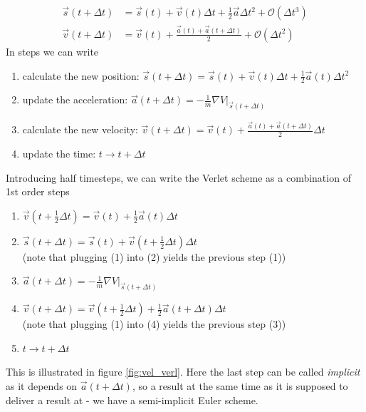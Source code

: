 \begin{equation}
  \begin{aligned}
    \vec{s}(t+\Delta t) &= \vec{s}(t) + \vec{v}(t) \Delta t + \frac{1}{2} \vec{a} \Delta t^2 +  \mathcal{O}(\Delta t^3) \\
    \vec{v}(t+\Delta t) &= \vec{v}(t) + \frac{\vec{a}(t) + \vec{a}(t + \Delta t)}{2} + \mathcal{O}(\Delta t^2)
  \end{aligned}
\end{equation}
In steps we can write
\begin{enumerate}
  \item calculate the new position: $\vec{s}(t+\Delta t) = \vec{s}(t) + \vec{v}(t)\Delta t + \frac{1}{2} \vec{a}(t) \Delta t^2$
  \item update the acceleration: $\vec{a}(t+\Delta t) = -\frac{1}{m} \left. \nabla V \right|_{\vec{s}(t+\Delta t)}$
  \item calculate the new velocity: $\vec{v}(t+\Delta t) = \vec{v}(t) + \frac{\vec{a}(t) + \vec{a}(t+\Delta t)}{2} \Delta t$
  \item update the time: $t \rightarrow t + \Delta t$
\end{enumerate}
Introducing half timesteps, we can write the Verlet scheme as a combination of 1st order steps
\begin{enumerate}
  \item $\vec{v}\left( t + \frac{1}{2} \Delta t \right) = \vec{v}(t) + \frac{1}{2} \vec{a}(t) \Delta t$
  \item $\vec{s}(t + \Delta t) = \vec{s}(t) + \vec{v}\left( t + \frac{1}{2}\Delta t \right) \Delta t$\\(note that plugging (1) into (2) yields the previous step (1))
  \item $\vec{a}(t+\Delta t) = -\frac{1}{m} \left. \nabla V \right|_{\vec{s}(t+\Delta t)}$
  \item $\vec{v}\left( t + \Delta t \right) = \vec{v}\left( t + \frac{1}{2} \Delta t \right) + \frac{1}{2} \vec{a}(t+\Delta t) \Delta t$\\(note that plugging (1) into (4) yields the previous step (3))
  \item $t \rightarrow t + \Delta t$
\end{enumerate}
This is illustrated in figure \ref{fig:vel_verl}. Here the last step can be called \textit{implicit} as it depends on $\vec{a}(t+\Delta t)$, so a result at the same time as it is supposed
to deliver a result at - we have a semi-implicit Euler scheme.


